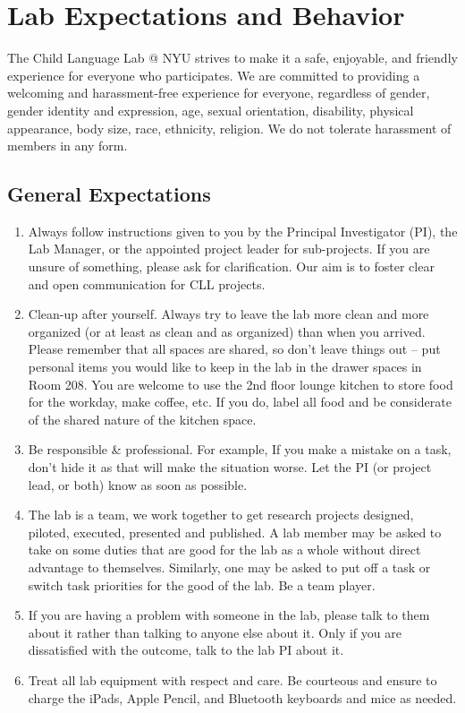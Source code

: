 \documentclass[
]{book}
\begin{document}
\hypertarget{lab-expectations-and-behavior}{%
\chapter{Lab Expectations and Behavior}\label{lab-expectations-and-behavior}}

The Child Language Lab @ NYU strives to make it a safe, enjoyable, and friendly experience for everyone who participates. We are committed to providing a welcoming and harassment-free experience for everyone, regardless of gender, gender identity and expression, age, sexual orientation, disability, physical appearance, body size, race, ethnicity, religion. We do not tolerate harassment of members in any form.

\hypertarget{general-expectations}{%
\section{General Expectations}\label{general-expectations}}

\begin{enumerate}
\def\labelenumi{\arabic{enumi}.}
\item
  Always follow instructions given to you by the Principal Investigator (PI), the Lab Manager, or the appointed project leader for sub-projects. If you are unsure of something, please ask for clarification. Our aim is to foster clear and open communication for CLL projects.
\item
  Clean-up after yourself. Always try to leave the lab more clean and more organized (or at least as clean and as organized) than when you arrived. Please remember that all spaces are shared, so don't leave things out -- put personal items you would like to keep in the lab in the drawer spaces in Room 208. You are welcome to use the 2nd floor lounge kitchen to store food for the workday, make coffee, etc. If you do, label all food and be considerate of the shared nature of the kitchen space.
\item
  Be responsible \& professional. For example, If you make a mistake on a task, don't hide it as that will make the situation worse. Let the PI (or project lead, or both) know as soon as possible.
\item
  The lab is a team, we work together to get research projects designed, piloted, executed, presented and published. A lab member may be asked to take on some duties that are good for the lab as a whole without direct advantage to themselves. Similarly, one may be asked to put off a task or switch task priorities for the good of the lab. Be a team player.
\item
  If you are having a problem with someone in the lab, please talk to them about it rather than talking to anyone else about it. Only if you are dissatisfied with the outcome, talk to the lab PI about it.
\item
  Treat all lab equipment with respect and care. Be courteous and ensure to charge the iPads, Apple Pencil, and Bluetooth keyboards and mice as needed.
\end{enumerate}
\end{document}
